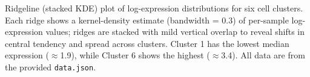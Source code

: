 \caption{Ridgeline (stacked KDE) plot of log-expression distributions for six cell clusters. Each ridge shows a kernel-density estimate (bandwidth = 0.3) of per-sample log-expression values; ridges are stacked with mild vertical overlap to reveal shifts in central tendency and spread across clusters. Cluster 1 has the lowest median expression ($\approx$1.9), while Cluster 6 shows the highest ($\approx$3.4). All data are from the provided \texttt{data.json}.}
